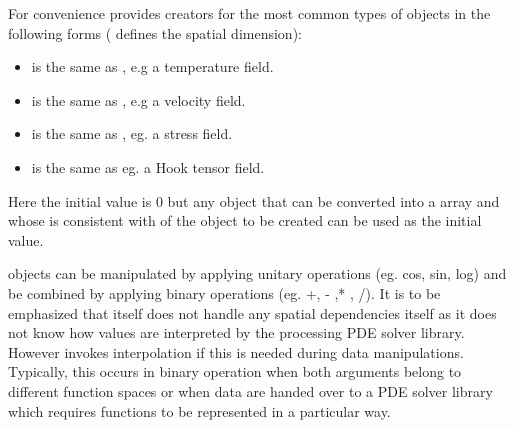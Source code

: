 For convenience \escript provides creators for the most common types
of \Data objects in the following forms ( defines the 
spatial dimension):
\begin{itemize}
\item {} is the same as , 
e.g a temperature field. 
\item {}is the same as , e.g
a velocity field.   
\item {} is the same as ,
eg. a stress field.  
\item {} is the same as 
eg. a Hook tensor field.   
\end{itemize}
Here the initial value is $0$ but any object that can be converted into a \numarray array and whose \Shape
is consistent with \Shape of the \Data object to be created can be used as the initial value.

\Data objects can be manipulated by applying unitary operations (eg. cos, sin, log) 
and be combined by applying binary operations (eg. +, - ,* , /). 
It is to be emphasized that \escript itself does not handle any spatial dependencies itself as 
it does not know how values are interpreted by the processing PDE solver library. 
However \escript invokes interpolation if this is needed during data manipulations. 
Typically, this occurs in binary operation when both arguments belong to different
function spaces or when data are handed over to a PDE solver library 
which requires functions to be represented in a particular way. 

